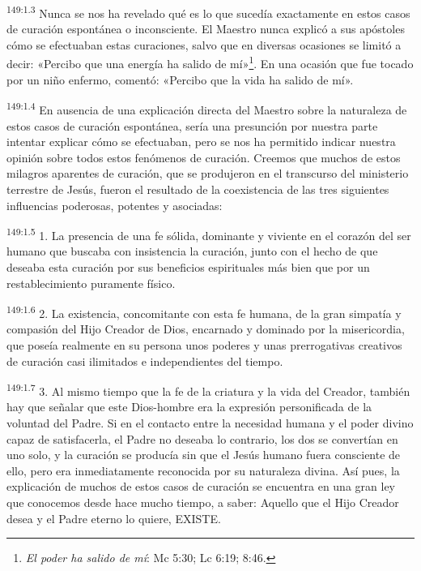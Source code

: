 \par 
\textsuperscript{149:1.3} Nunca se nos ha revelado qué es lo que sucedía exactamente en estos casos de curación espontánea o inconsciente. El Maestro nunca explicó a sus apóstoles cómo se efectuaban estas curaciones, salvo que en diversas ocasiones se limitó a decir: «Percibo que una energía ha salido de mí»\footnote{\textit{El poder ha salido de mí}: Mc 5:30; Lc 6:19; 8:46.}. En una ocasión que fue tocado por un niño enfermo, comentó: «Percibo que la vida ha salido de mí».

\par 
\textsuperscript{149:1.4} En ausencia de una explicación directa del Maestro sobre la naturaleza de estos casos de curación espontánea, sería una presunción por nuestra parte intentar explicar cómo se efectuaban, pero se nos ha permitido indicar nuestra opinión sobre todos estos fenómenos de curación. Creemos que muchos de estos milagros aparentes de curación, que se produjeron en el transcurso del ministerio terrestre de Jesús, fueron el resultado de la coexistencia de las tres siguientes influencias poderosas, potentes y asociadas:

\par 
\textsuperscript{149:1.5} 1. La presencia de una fe sólida, dominante y viviente en el corazón del ser humano que buscaba con insistencia la curación, junto con el hecho de que deseaba esta curación por sus beneficios espirituales más bien que por un restablecimiento puramente físico.

\par 
\textsuperscript{149:1.6} 2. La existencia, concomitante con esta fe humana, de la gran simpatía y compasión del Hijo Creador de Dios, encarnado y dominado por la misericordia, que poseía realmente en su persona unos poderes y unas prerrogativas creativos de curación casi ilimitados e independientes del tiempo.

\par 
\textsuperscript{149:1.7} 3. Al mismo tiempo que la fe de la criatura y la vida del Creador, también hay que señalar que este Dios-hombre era la expresión personificada de la voluntad del Padre. Si en el contacto entre la necesidad humana y el poder divino capaz de satisfacerla, el Padre no deseaba lo contrario, los dos se convertían en uno solo, y la curación se producía sin que el Jesús humano fuera consciente de ello, pero era inmediatamente reconocida por su naturaleza divina. Así pues, la explicación de muchos de estos casos de curación se encuentra en una gran ley que conocemos desde hace mucho tiempo, a saber: Aquello que el Hijo Creador desea y el Padre eterno lo quiere, EXISTE.

